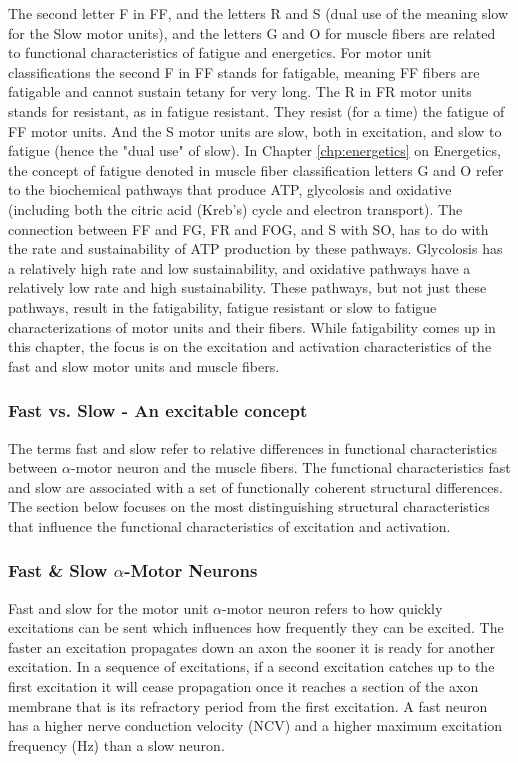 The second letter F in FF, and the letters R and S (dual use of the meaning slow for the Slow motor units), and the letters G and O for muscle fibers are related to functional characteristics of fatigue and energetics. For motor unit classifications the second F in FF stands for fatigable, meaning FF fibers are fatigable and cannot sustain tetany for very long. The R in FR motor units stands for resistant, as in fatigue resistant. They resist (for a time) the fatigue of FF motor units. And the S motor units are slow, both in excitation, and slow to fatigue (hence the "dual use" of slow). In Chapter \ref{chp:energetics} on Energetics, the concept of fatigue denoted in muscle fiber classification letters G and O refer to the biochemical pathways that produce ATP, glycolosis and oxidative (including both the citric acid (Kreb's) cycle and electron transport). The connection between FF and FG, FR and FOG, and S with SO, has to do with the rate and sustainability of ATP production by these pathways. Glycolosis has a relatively high rate and low sustainability, and oxidative pathways have a relatively low rate and high sustainability. These pathways, but not just these pathways, result in the fatigability, fatigue resistant or slow to fatigue characterizations of motor units and their fibers. While fatigability comes up in this chapter, the focus is on the excitation and activation characteristics of the fast and slow motor units and muscle fibers.

\subsubsection{Fast vs. Slow - An excitable concept}

The terms fast and slow refer to relative differences in functional characteristics between $\alpha$-motor neuron and the muscle fibers. The functional characteristics fast and slow are associated with a set of functionally coherent structural differences. The section below focuses on the most distinguishing structural characteristics that influence the functional characteristics of excitation and activation.

\subsubsection{Fast \& Slow $\alpha$-Motor Neurons}
Fast and slow for the motor unit $\alpha$-motor neuron refers to how quickly excitations can be sent which influences how frequently they can be excited. The faster an excitation propagates down an axon the sooner it is ready for another excitation. In a sequence of excitations, if a second excitation catches up to the first excitation it will cease propagation once it reaches a section of the axon membrane that is its refractory period from the first excitation. A fast neuron has a higher nerve conduction velocity (NCV) and a higher maximum excitation frequency (Hz) than a slow neuron.

